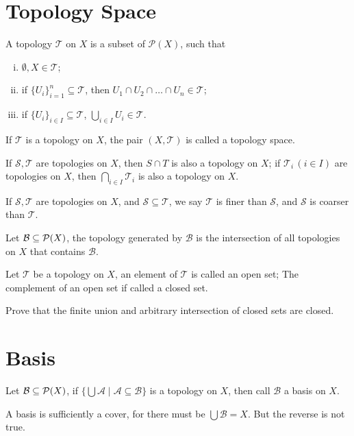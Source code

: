 \section{Topology Space}
\begin{defi}
A topology $\mathcal{T}$ on $X$ is a subset of $\mathcal{P}(X)$, such that
\begin{enumerate}[i).]
\item $\emptyset, X \in \mathcal{T}$;
\item if $\{U_i\}_{i=1}^n \subseteq \mathcal{T}$, then $U_1 \cap U_2 \cap \dots \cap U_n \in \mathcal{T}$;
\item if $\{U_i\}_{i \in I} \subseteq \mathcal{T}$, $\bigcup_{i \in I} U_i \in \mathcal{T}$.
\end{enumerate}
\end{defi}
If $\mathcal{T}$ is a topology on $X$, the pair $(X, \mathcal{T})$ is called a topology space.

\begin{pro}
If $\mathcal{S}, \mathcal{T}$ are topologies on $X$, then $S \cap T$ is also a topology on $X$;
if $\mathcal{T}_i \, (i \in I)$ are topologies on $X$, then $\bigcap_{i \in I} \mathcal{T}_i$ is also a topology on $X$.
\end{pro}

If $\mathcal{S}, \mathcal{T}$ are topologies on $X$, and $\mathcal{S} \subseteq \mathcal{T}$,
we say $\mathcal{T}$ is finer than $\mathcal{S}$,
and $\mathcal{S}$ is coarser than $\mathcal{T}$.

\begin{defi}
Let $\mathcal{B} \subseteq \mathcal{P}(X)$, the topology generated by $\mathcal{B}$
is the intersection of all topologies on $X$ that contains $\mathcal{B}$.
\end{defi}

\begin{defi}
Let $\mathcal{T}$ be a topology on $X$,
an element of $\mathcal{T}$ is called an open set;
The complement of an open set if called a closed set.
\end{defi}

\begin{exer}
Prove that the finite union and arbitrary intersection of closed sets are closed.
\end{exer}

\section{Basis}
\begin{defi}
Let $\mathcal{B} \subseteq \mathcal{P}(X)$, if $\{\bigcup \mathcal{A} \mid \mathcal{A} \subseteq \mathcal{B}\}$
is a topology on $X$, then call $\mathcal{B}$ a basis on $X$.
\end{defi}
A basis is sufficiently a cover, for there must be $\bigcup \mathcal{B} = X$.
But the reverse is not true.

